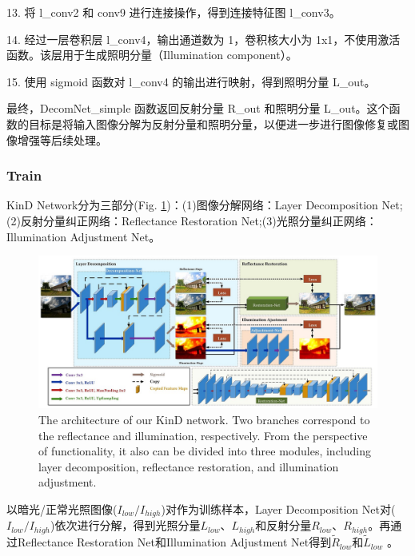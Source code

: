 \documentclass[letterpaper,12pt]{article}
\begin{document}
		13. 将 l\_conv2 和 conv9 进行连接操作，得到连接特征图 l\_conv3。
		
		14. 经过一层卷积层 l\_conv4，输出通道数为 1，卷积核大小为 1x1，不使用激活函数。该层用于生成照明分量（Illumination component）。
		
		15. 使用 sigmoid 函数对 l\_conv4 的输出进行映射，得到照明分量 L\_out。
		
		最终，DecomNet\_simple 函数返回反射分量 R\_out 和照明分量 L\_out。这个函数的目标是将输入图像分解为反射分量和照明分量，以便进一步进行图像修复或图像增强等后续处理。
	
		\subsubsection{Train}
	
			KinD Network分为三部分(Fig. \ref{fig: network})：(1)图像分解网络：Layer Decomposition Net;(2)反射分量纠正网络：Reflectance Restoration Net;(3)光照分量纠正网络：Illumination Adjustment Net。
	
		\begin{figure}[htbp]
			\centering \includegraphics[width=0.8\columnwidth]{network}
			\captionsetup{font=scriptsize}
			\caption{
				\label{fig: network} %
				The architecture of our KinD network. Two branches correspond to the reflectance and illumination, respectively. From the perspective of functionality, it also can be divided into three modules, including layer decomposition, reflectance restoration, and illumination adjustment.
			}
		\end{figure}
	
		以暗光/正常光照图像($I_{low}/I_{high}$)对作为训练样本，Layer Decomposition Net对($I_{low}/I_{high}$)依次进行分解，得到光照分量$L_{low}$、$L_{high}$和反射分量$R_{low}$、$R_{high}$。再通过Reflectance Restoration Net和Illumination Adjustment Net得到$\tilde{R}_{low}$和$\tilde{L}_{low}$
	。
	
\end{document}
